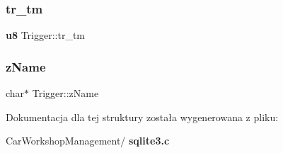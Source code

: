 \subsubsection{tr\_tm}
{\footnotesize\ttfamily \textbf{ u8} Trigger\+::tr\+\_\+tm}

\mbox{\label{struct_trigger_a9aecea5dadd7ae93b7f585c4b914791c}} 
\subsubsection{zName}
{\footnotesize\ttfamily char$\ast$ Trigger\+::z\+Name}



Dokumentacja dla tej struktury została wygenerowana z pliku\+:\begin{DoxyCompactItemize}
\item 
Car\+Workshop\+Management/\textbf{ sqlite3.\+c}\end{DoxyCompactItemize}

